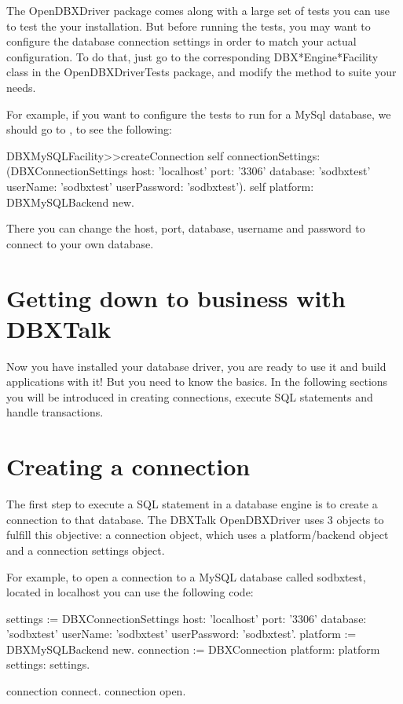 \documentclass[a4paper,10pt,twoside]{book}
\begin{document}
The OpenDBXDriver package comes along with a large set of tests you can use to test the your installation.  But before running
 the tests, you may want to configure the database connection settings in order to match your actual configuration.
To do that, just go to the corresponding DBX*Engine*Facility class in the OpenDBXDriverTests package, and modify the
 method to suite your needs.

For example, if you want to configure the tests to run for a MySql database, we should go to , to see the following:

\begin{code}{}
DBXMySQLFacility>>createConnection
    self connectionSettings: (DBXConnectionSettings
			    host: 'localhost'
			    port: '3306'
			    database: 'sodbxtest'
			    userName: 'sodbxtest'
			    userPassword: 'sodbxtest').
    self platform: DBXMySQLBackend new.
\end{code}

There you can change the host, port, database, username and password to connect to your own database.


\section{Getting down to business with DBXTalk}
Now you have installed your database driver, you are ready to use it and build applications with it!  But you need to know the basics.  In the following sections you will be introduced in creating connections, execute SQL statements and handle transactions.

\section{Creating a connection}
The first step to execute a SQL statement in a database engine is to create a connection to that database.  The DBXTalk OpenDBXDriver uses 3 objects to fulfill this objective: a connection object, which uses a platform/backend object and a connection settings object.

For example, to open a connection to a MySQL database called sodbxtest, located in localhost you can use the following code:

\begin{code}{}
settings := DBXConnectionSettings
                     host: 'localhost'
                     port: '3306'
                     database: 'sodbxtest'
                     userName: 'sodbxtest'
                     userPassword: 'sodbxtest'.
platform := DBXMySQLBackend new.
connection := DBXConnection platform: platform settings: settings.

connection connect.
connection open.
\end{code}
\end{document}
